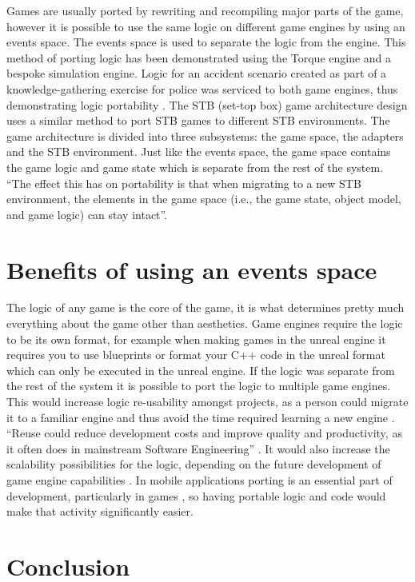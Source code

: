 \documentclass{scrartcl}
\begin{document}
Games are usually ported by rewriting and recompiling major parts of the game, however it is possible to use the same logic on different game engines by using an events space. The events space is used to separate the logic from the engine. This method of porting logic has been demonstrated using the Torque engine and a bespoke simulation engine. Logic for an accident scenario created as part of a knowledge-gathering exercise for police was serviced to both game engines, thus demonstrating logic portability \cite{GameLogic}.
The STB (set-top box) game architecture design \cite{STB} uses a similar method to port STB games to different STB environments. The game architecture is divided into three subsystems: the game space, the adapters and the STB environment. Just like the events space, the game space contains the game logic and game state which is separate from the rest of the system. ``The effect this has on portability is that when migrating to a new STB environment, the elements in the game space (i.e., the game state, object model, and game logic) can stay intact''\cite{STB}.

\section{Benefits of using an events space}

The logic of any game is the core of the game, it is what determines pretty much everything about the game other than aesthetics. Game engines require the logic to be its own format, for example when making games in the unreal engine it requires you to use blueprints or format your C++ code in the unreal format which can only be executed in the unreal engine. If the logic was separate from the rest of the system it is possible to port the logic to multiple game engines. This would increase logic re-usability amongst projects, as a person could migrate it to a familiar engine and thus avoid the time required learning a new engine \cite{GameLogic}. ``Reuse could reduce development costs and improve quality and productivity, as it often does in mainstream Software Engineering'' \cite{ComputerGameSE}. It would also increase the scalability possibilities for the logic, depending on the future development of game engine capabilities \cite{GameLogic}. In mobile applications porting is an essential part of development, particularly in games \cite{PortingJ2ME,PortingMobileGames}, so having portable logic and code would make that activity significantly easier.

\section*{Conclusion}
\end{document}
